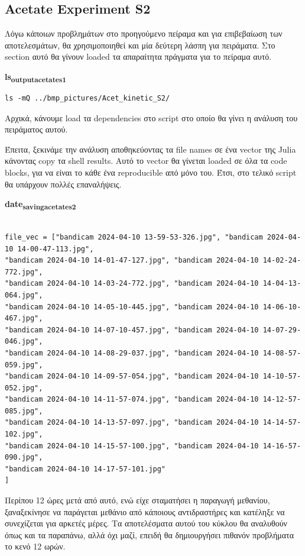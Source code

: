 \documentclass[11pt]{article}
\begin{document}
\subsection{Acetate Experiment S2}
\label{sec:org2fe88db}
Λόγω κάποιων προβλημάτων στο προηγούμενο πείραμα και για επιβεβαίωση των αποτελεσμάτων, θα χρησιμοποιηθεί και μία δεύτερη λάσπη για πειράματα. Στο section αυτό θα γίνουν loaded τα απαραίτητα πράγματα για το πείραμα αυτό.

\textbf{ls\textsubscript{output}\textsubscript{acetate}\textsubscript{s1}}
\begin{verbatim}
ls -mQ ../bmp_pictures/Acet_kinetic_S2/
\end{verbatim}

Αρχικά, κάνουμε load τα dependencies στο script στο οποίο θα γίνει η ανάλυση του πειράματος αυτού.

Έπειτα, ξεκινάμε την ανάλυση αποθηκεύοντας τα file names σε ένα vector της Julia κάνοντας copy τα shell results. Αυτό το vector θα γίνεται loaded σε όλα τα code blocks, για να είναι το κάθε ένα reproducible από μόνο του. Έτσι, στο τελικό script θα υπάρχουν πολλές επαναλήψεις.

\textbf{date\textsubscript{saving}\textsubscript{acetate}\textsubscript{s2}}
\begin{verbatim}

file_vec = ["bandicam 2024-04-10 13-59-53-326.jpg", "bandicam 2024-04-10 14-00-47-113.jpg",
"bandicam 2024-04-10 14-01-47-127.jpg", "bandicam 2024-04-10 14-02-24-772.jpg",
"bandicam 2024-04-10 14-03-24-772.jpg", "bandicam 2024-04-10 14-04-13-064.jpg",
"bandicam 2024-04-10 14-05-10-445.jpg", "bandicam 2024-04-10 14-06-10-467.jpg",
"bandicam 2024-04-10 14-07-10-457.jpg", "bandicam 2024-04-10 14-07-29-046.jpg",
"bandicam 2024-04-10 14-08-29-037.jpg", "bandicam 2024-04-10 14-08-57-059.jpg",
"bandicam 2024-04-10 14-09-57-054.jpg", "bandicam 2024-04-10 14-10-57-052.jpg",
"bandicam 2024-04-10 14-11-57-074.jpg", "bandicam 2024-04-10 14-12-57-085.jpg",
"bandicam 2024-04-10 14-13-57-097.jpg", "bandicam 2024-04-10 14-14-57-102.jpg",
"bandicam 2024-04-10 14-15-57-100.jpg", "bandicam 2024-04-10 14-16-57-090.jpg",
"bandicam 2024-04-10 14-17-57-101.jpg"
]

\end{verbatim}

Περίπου 12 ώρες μετά από αυτό, ενώ είχε σταματήσει η παραγωγή μεθανίου, ξαναξεκίνησε να παράγεται μεθάνιο από κάποιους αντιδραστήρες και κατέληξε να συνεχίζεται για αρκετές μέρες. Τα αποτελέσματα αυτού του κύκλου θα αναλυθούν όπως και τα παραπάνω, αλλά όχι μαζί, επειδή θα δημιουργήσει πιθανόν προβλήματα το κενό 12 ωρών.
\end{document}
